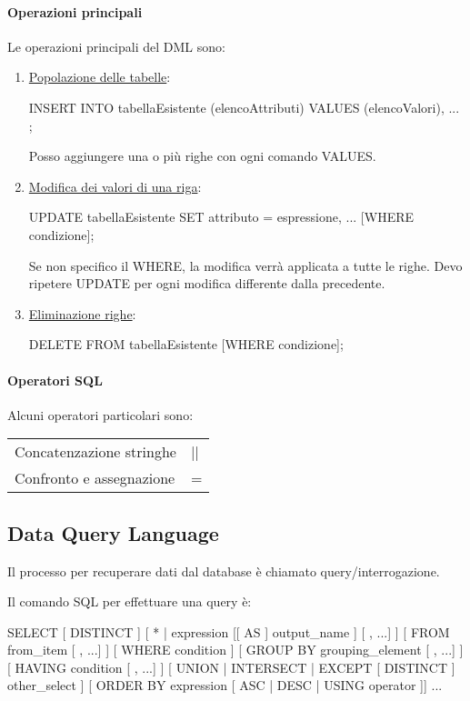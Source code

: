 \documentclass[a4paper, 10pt]{report}
\begin{document}
\paragraph*{Operazioni principali} Le operazioni principali del DML sono:
\begin{enumerate}
\item \underline{Popolazione delle tabelle}:
\begin{code}
	INSERT INTO tabellaEsistente (elencoAttributi)
		VALUES (elencoValori), 
		...
		;
\end{code}
\noindent Posso aggiungere una o più righe con ogni comando VALUES.

\item \underline{Modifica dei valori di una riga}:
\begin{code}
	UPDATE tabellaEsistente
		SET attributo = espressione,
		...
		[WHERE condizione];
\end{code}
\noindent Se non specifico il WHERE, la modifica verrà applicata a tutte le righe. Devo ripetere UPDATE per ogni modifica differente dalla precedente.

\item \underline{Eliminazione righe}:
\begin{code}
	DELETE FROM tabellaEsistente 
	[WHERE condizione];
\end{code}
\end{enumerate}

\paragraph*{Operatori SQL} Alcuni operatori particolari sono:
\begin{longtable}{ p{}  p{}}{Concatenzazione stringhe} & {||}
\\
{Confronto e assegnazione} & {=}
\end{longtable}

\subsection{Data Query Language}
Il processo per recuperare dati dal database è chiamato query/interrogazione.

\noindent Il comando SQL per effettuare una query è:
\begin{code}
	SELECT [ DISTINCT ]
	[ * | expression [[ AS ] output_name ] [ , ...] ]
	[ FROM from_item [ , ...] ]
	[ WHERE condition ]
	[ GROUP BY grouping_element [ , ...] ]
	[ HAVING condition [ , ...] ]
	[ { UNION | INTERSECT | EXCEPT } [ DISTINCT ]
		other_select ]
	[ ORDER BY expression [ ASC | DESC | USING operator ]]
	...
\end{code}
\end{document}
